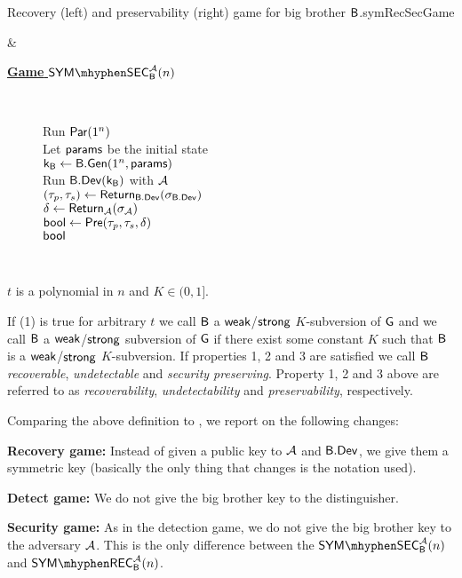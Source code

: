 \begin{defn}
\begin{enumerate}[1.]
\begin{boxfigTwo}{Recovery (left) and preservability (right) game for big brother $\mathsf{B}$.}{symRecSecGame}
\begin{minipage}{0.45\textwidth}
\end{minipage}
    & 
\begin{minipage}{0.45\textwidth}
    \smallskip
	\begin{description}
	\item[\underline{\textbf{Game} $\symsecgame_{\bb}^{\adve}(n)$}] ~
 	
 		Run $\operatorname{\mathsf{Par}}(1^n)$ \\
 		Let $\mathsf{params}$ be the initial state \\
 		$\mathsf{k}_{\mathsf{B}}\leftarrow \mathsf{B}.\mathsf{Gen}(1^n,\mathsf{params})$ \\
 		Run $\mathsf{B}.\mathsf{Dev}(\mathsf{k}_{\mathsf{B}})$ with $\mathcal{A}$ \\
 		$(\tau_p,\tau_s)\leftarrow \operatorname{\mathsf{Return}}_{\mathsf{B}.\mathsf{Dev}}(\sigma_{\mathsf{B}.\mathsf{Dev}})$ \\	
 		$\delta\leftarrow \operatorname{\mathsf{Return}}_{\mathcal{A}}(\sigma_{\mathcal{A}})$ \\
 		$\mathsf{bool} \leftarrow \operatorname{\mathsf{Pre}}(\tau_p,\tau_s,\delta)$ \\
 		\Ret $\mathsf{bool}$ 
		\smallskip
  	\end{description}
\end{minipage}
\\ 
\end{boxfigTwo}
	\end{enumerate}
$t$ is a polynomial in $n$ and $K\in(0,1]$.

If (1) is true for arbitrary $t$ we call $\mathsf{B}$ a $\mathsf{weak}$/$\mathsf{strong}$ $K$-subversion of $\operatorname{\mathsf{G}}$ and we call $\mathsf{B}$ a $\mathsf{weak}$/$\mathsf{strong}$ subversion of $\operatorname{\mathsf{G}}$ if there exist some constant $K$ such that $\mathsf{B}$ is a $\mathsf{weak}$/$\mathsf{strong}$ $K$-subversion. If properties 1, 2 and 3 are satisfied we call $\mathsf{B}$ \emph{recoverable}, \emph{undetectable} and \emph{security preserving}. Property 1, 2 and 3 above are referred to as \emph{recoverability}, \emph{undetectability} and \emph{preservability}, respectively.
\end{defn}

Comparing the above definition to , we report on the following changes:

\noindent\textbf{Recovery game:} Instead of given a public key to $\mathcal{A}$ and $\mathsf{B}.\mathsf{Dev}$, we give them a symmetric key (basically the only thing that changes is the notation used).

\noindent\textbf{Detect game:} We do not give the big brother key to the distinguisher. 

\noindent\textbf{Security game:} As in the detection game, we do not give the big brother key to the adversary $\mathcal{A}$. This is the only difference between the $\symsecgame_{\bb}^{\adve}(n)$ and $\symrecgame_{\bb}^{\adve}(n)$.

